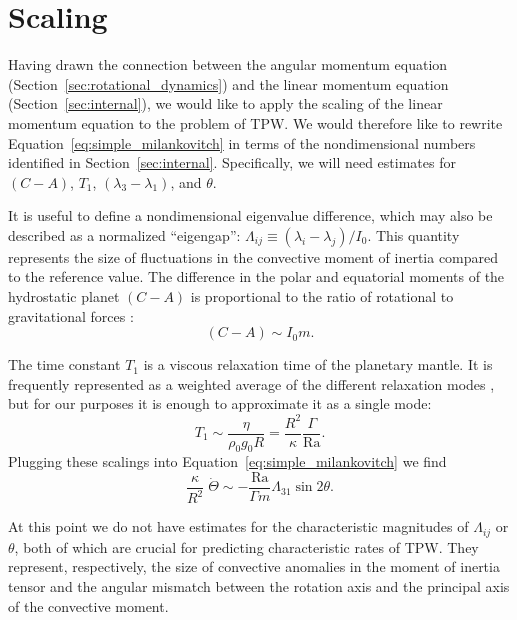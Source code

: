 \documentclass[preprint,12pt,authoryear]{elsarticle}
\begin{document}
\section{Scaling}
\label{sec:scaling}

Having drawn the connection between the angular momentum equation (Section~\ref{sec:rotational_dynamics}) and the linear momentum 
equation (Section~\ref{sec:internal}), we would like to apply the scaling of the 
linear momentum equation to the problem of TPW. We would therefore like to rewrite Equation~\eqref{eq:simple_milankovitch}
in terms of the nondimensional numbers identified in Section~\ref{sec:internal}.
Specifically, we will need estimates for $(C-A)$, $T_1$, $(\lambda_3-\lambda_1)$, and $\theta$. 

It is useful to define a nondimensional eigenvalue difference, which may also be described as a normalized ``eigengap'': $\Lambda_{ij} \equiv (\lambda_i - \lambda_j)/I_0$.  
This quantity represents the size of fluctuations in the convective moment of inertia compared to the reference value.
The difference in the polar and equatorial moments of the hydrostatic planet $(C-A)$ is 
proportional to the ratio of rotational to gravitational forces \citep{munk1960rotation}:
\begin{equation}
(C-A) \sim I_0 m.
\end{equation}

The time constant $T_1$ is a viscous relaxation time of the planetary mantle. It is frequently represented as a weighted average of the different relaxation modes \citep[e.g.][]{ricard1993polar, greff2004upwelling}, but for our purposes it is enough to approximate it as a single mode:
\begin{equation}
T_1 \sim \frac{ \eta }{ \rho_0 g_0 R} = \frac{R^2}{\kappa} \frac{\Gamma}{\mathrm{Ra} }.
\end{equation}
Plugging these scalings into Equation~\eqref{eq:simple_milankovitch} we find
\begin{equation}
\frac{\kappa}{R^2} \; \dot{\Theta} \sim - \frac{\mathrm{Ra}}{\Gamma m} \Lambda_{31} \sin{2 \theta}.
\label{eq:scaled_rotation}
\end{equation}

At this point we do not have estimates for the characteristic magnitudes of $\Lambda_{ij}$ or $\theta$, both of which are crucial for predicting characteristic rates of TPW.
They represent, respectively, the size of convective anomalies in the moment of inertia tensor and the angular mismatch between the rotation axis and the principal axis of the convective moment.
\end{document}
